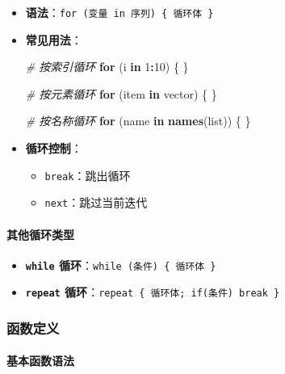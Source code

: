 \documentclass[
]{book}
\newenvironment{Shaded}{\begin{snugshade}}{\end{snugshade}}
\newcommand{\CommentTok}[1]{\textcolor[rgb]{0.56,0.35,0.01}{\textit{#1}}}
\newcommand{\ControlFlowTok}[1]{\textcolor[rgb]{0.13,0.29,0.53}{\textbf{#1}}}
\newcommand{\DecValTok}[1]{\textcolor[rgb]{0.00,0.00,0.81}{#1}}
\newcommand{\FunctionTok}[1]{\textcolor[rgb]{0.13,0.29,0.53}{\textbf{#1}}}
\newcommand{\NormalTok}[1]{#1}
\newcommand{\SpecialCharTok}[1]{\textcolor[rgb]{0.81,0.36,0.00}{\textbf{#1}}}
\providecommand{\tightlist}{%
  \setlength{\itemsep}{0pt}\setlength{\parskip}{0pt}}
\begin{document}
\begin{itemize}
\item
  \textbf{语法}：\texttt{for\ (变量\ in\ 序列)\ \{\ 循环体\ \}}
\item
  \textbf{常见用法}：

\begin{Shaded}
\begin{Highlighting}[]
\CommentTok{\# 按索引循环}
\ControlFlowTok{for}\NormalTok{ (i }\ControlFlowTok{in} \DecValTok{1}\SpecialCharTok{:}\DecValTok{10}\NormalTok{) \{ \}}

\CommentTok{\# 按元素循环}
\ControlFlowTok{for}\NormalTok{ (item }\ControlFlowTok{in}\NormalTok{ vector) \{ \}}

\CommentTok{\# 按名称循环}
\ControlFlowTok{for}\NormalTok{ (name }\ControlFlowTok{in} \FunctionTok{names}\NormalTok{(list)) \{ \}}
\end{Highlighting}
\end{Shaded}
\item
  \textbf{循环控制}：

  \begin{itemize}
  \tightlist
  \item
    \texttt{break}：跳出循环
  \item
    \texttt{next}：跳过当前迭代
  \end{itemize}
\end{itemize}

\hypertarget{ux5176ux4ed6ux5faaux73afux7c7bux578b}{%
\paragraph{其他循环类型}\label{ux5176ux4ed6ux5faaux73afux7c7bux578b}}

\begin{itemize}
\tightlist
\item
  \textbf{\texttt{while} 循环}：\texttt{while\ (条件)\ \{\ 循环体\ \}}
\item
  \textbf{\texttt{repeat} 循环}：\texttt{repeat\ \{\ 循环体;\ if(条件)\ break\ \}}
\end{itemize}

\hypertarget{ux51fdux6570ux5b9aux4e49}{%
\subsubsection{函数定义}\label{ux51fdux6570ux5b9aux4e49}}

\hypertarget{ux57faux672cux51fdux6570ux8bedux6cd5}{%
\paragraph{基本函数语法}\label{ux57faux672cux51fdux6570ux8bedux6cd5}}
\end{document}

